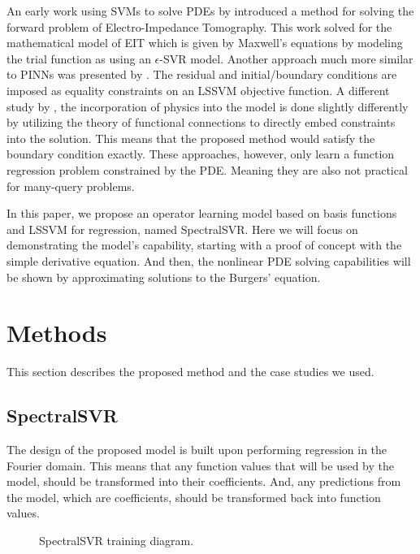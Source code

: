 \documentclass[preprint,12pt,times,authoryear]{elsarticle}
\begin{document}
An early work using SVMs to solve PDEs by \citet{youxiwuSVMSolvingForward2005} introduced a method for solving the forward problem of Electro-Impedance Tomography. This work solved for the mathematical model of EIT which is given by Maxwell's equations by modeling the trial function as using an \(\epsilon \)-SVR model. Another approach much more similar to PINNs was presented by \citet{mehrkanoonLearningSolutionsPartial2015}. The residual and initial/boundary conditions are imposed as equality constraints on an LSSVM objective function. A different study by \citet{leakeAnalyticallyEmbeddingDifferential2019}, the incorporation of physics into the model is done slightly differently by utilizing the theory of functional connections to directly embed constraints into the solution. This means that the proposed method would satisfy the boundary condition exactly. These approaches, however, only learn a function regression problem constrained by the PDE\@. Meaning they are also not practical for many-query problems.

In this paper, we propose an operator learning model based on basis functions and LSSVM for regression, named SpectralSVR\@. Here we will focus on demonstrating the model's capability, starting with a proof of concept with the simple derivative equation. And then, the nonlinear PDE solving capabilities will be shown by approximating solutions to the Burgers' equation.%

\section{Methods}
This section describes the proposed method and the case studies we used.
\subsection{SpectralSVR}
The design of the proposed model is built upon performing regression in the Fourier domain. This means that any function values that will be used by the model, should be transformed into their coefficients. And, any predictions from the model, which are coefficients, should be transformed back into function values.
\begin{figure}[hbp]
  \centering
  \caption{SpectralSVR training diagram.}\label{fig:spectralsvr_training}
\end{figure}
\end{document}
